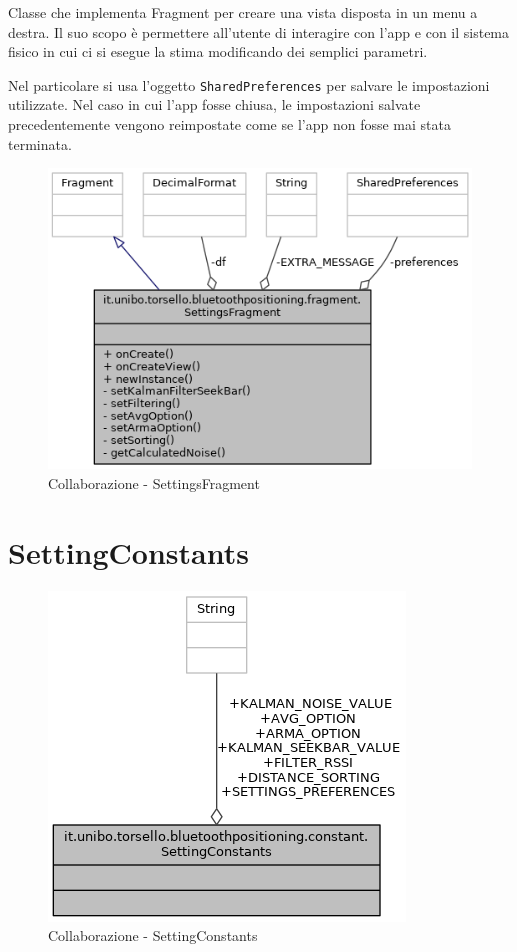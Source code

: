 Classe che implementa Fragment per creare una vista disposta in un menu a destra. Il suo scopo è permettere all'utente di interagire con l'app e con il sistema fisico in cui ci si esegue la stima modificando dei semplici parametri.

\newpage
Nel particolare si usa l'oggetto \texttt{SharedPreferences} per salvare le impostazioni utilizzate. Nel caso in cui l'app fosse chiusa, le impostazioni salvate precedentemente vengono reimpostate come se l'app non fosse mai stata terminata.

\begin{figure}[ph]
	\centering
	\includegraphics[width=0.8\linewidth]{img/uml/class/classit_1_1unibo_1_1torsello_1_1bluetoothpositioning_1_1fragment_1_1SettingsFragment__coll__graph.png}
	\caption{Collaborazione - SettingsFragment}
\end{figure}

\newpage
\section{SettingConstants}
\begin{figure}[ph]
	\centering
	\includegraphics[width=0.5\linewidth]{img/uml/class/classit_1_1unibo_1_1torsello_1_1bluetoothpositioning_1_1constant_1_1SettingConstants__coll__graph.png}
	\caption{Collaborazione - SettingConstants}
\end{figure}

